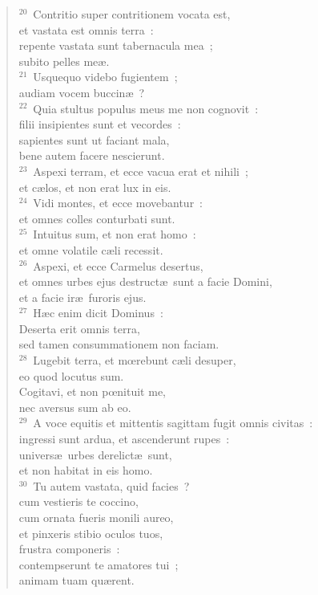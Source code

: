 \begin{flushleft}
\begin{verse}
${}^{20}$~Contritio super contritionem vocata est,\\ et vastata est omnis terra~:\\ repente vastata sunt tabernacula mea~;\\ subito pelles me\ae .\\
${}^{21}$~Usquequo videbo fugientem~;\\ audiam vocem buccin\ae~?\\
${}^{22}$~Quia stultus populus meus me non cognovit~:\\ filii insipientes sunt et vecordes~:\\ sapientes sunt ut faciant mala,\\ bene autem facere nescierunt.\\
${}^{23}$~Aspexi terram, et ecce vacua erat et nihili~;\\ et c\ae los, et non erat lux in eis.\\
${}^{24}$~Vidi montes, et ecce movebantur~:\\ et omnes colles conturbati sunt.\\
${}^{25}$~Intuitus sum, et non erat homo~:\\ et omne volatile c\ae li recessit.\\
${}^{26}$~Aspexi, et ecce Carmelus desertus,\\ et omnes urbes ejus destruct\ae\ sunt a facie Domini,\\ et a facie ir\ae\ furoris ejus.\\
${}^{27}$~H\ae c enim dicit Dominus~:\\ Deserta erit omnis terra,\\ sed tamen consummationem non faciam.\\
${}^{28}$~Lugebit terra, et mœrebunt c\ae li desuper,\\ eo quod locutus sum.\\ Cogitavi, et non pœnituit me,\\ nec aversus sum ab eo.\\
${}^{29}$~A voce equitis et mittentis sagittam fugit omnis civitas~:\\ ingressi sunt ardua, et ascenderunt rupes~:\\ univers\ae\ urbes derelict\ae\ sunt,\\ et non habitat in eis homo.\\
${}^{30}$~Tu autem vastata, quid facies~?\\ cum vestieris te coccino,\\ cum ornata fueris monili aureo,\\ et pinxeris stibio oculos tuos,\\ frustra componeris~:\\ contempserunt te amatores tui~;\\ animam tuam qu\ae rent.\\

\end{verse}
\end{flushleft}
